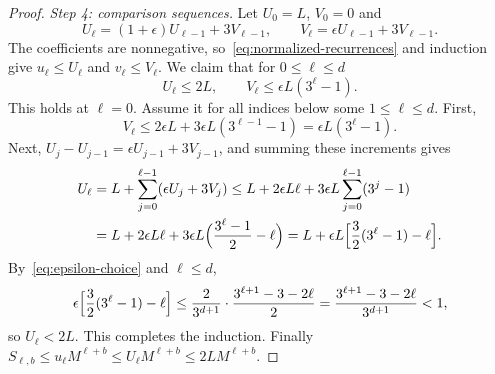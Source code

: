 \documentclass[11pt]{article}
\theoremstyle{definition}
\theoremstyle{remark}
\begin{document}
\begin{proof}
\emph{Step 4: comparison sequences.} Let $U_0=L$, $V_0=0$ and
\[
 U_\ell=(1+\epsilon)U_{\ell-1}+3V_{\ell-1},
 \qquad
 V_\ell=\epsilon U_{\ell-1}+3V_{\ell-1}.
\]
The coefficients are nonnegative, so~\eqref{eq:normalized-recurrences} and
induction give $u_\ell\le U_\ell$ and $v_\ell\le V_\ell$. We claim that for
$0\le\ell\le d$
\begin{equation}
\label{eq:comparison-bounds}
 U_\ell\leq2L,
 \qquad
 V_\ell\leq\epsilon L(3^\ell-1).
\end{equation}
This holds at $\ell=0$. Assume it for all indices below some
$1\le\ell\le d$. First,
\[
 V_\ell\le2\epsilon L+3\epsilon L(3^{\ell-1}-1)=\epsilon L(3^\ell-1).
\]
Next, $U_j-U_{j-1}=\epsilon U_{j-1}+3V_{j-1}$, and summing these increments
gives
\begin{align*}
 U_\ell
 &=L+\sum_{j=0}^{\ell-1}(\epsilon U_j+3V_j)
 \le L+2\epsilon L\ell+3\epsilon L\sum_{j=0}^{\ell-1}(3^j-1)\\
 &=L+2\epsilon L\ell+3\epsilon L\Bigl(\frac{3^\ell-1}2-\ell\Bigr)
 =L+\epsilon L\Bigl[\frac32(3^\ell-1)-\ell\Bigr].
\end{align*}
By~\eqref{eq:epsilon-choice} and $\ell\le d$,
\[
 \epsilon\Bigl[\frac32(3^\ell-1)-\ell\Bigr]
 \le\frac{2}{3^{d+1}}\cdot\frac{3^{\ell+1}-3-2\ell}{2}
 =\frac{3^{\ell+1}-3-2\ell}{3^{d+1}}<1,
\]
so $U_\ell<2L$. This completes the induction. Finally
$S_{\ell,b}\le u_\ell M^{\ell+b}\le U_\ell M^{\ell+b}\le2LM^{\ell+b}$.
\end{proof}
\end{document}
